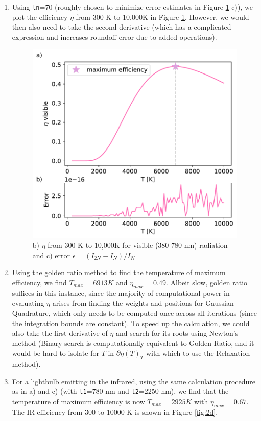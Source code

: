 \documentclass{article}
\newcommand{\code}{\texttt}
\begin{document}
\begin{enumerate}
\begin{enumerate}
  \item Using \code{ln}=70 (roughly chosen to minimize error estimates in Figure \ref{fig:2bc} c)), we plot the efficiency $\eta$ from 300 K to 10,000K in Figure \ref{fig:2bc}. 
  However, we would then also need to take the second derivative (which has a complicated expression and increases roundoff error due to added operations).
  \begin{figure}[H]
    \centering 
    \captionsetup{margin=3.2cm}
    \includegraphics[width=0.5\linewidth]{Q2bc.pdf}
    \caption{\label{fig:2bc} b) $\eta$ from 300 K to 10,000K for visible (380-780 nm) radiation and c) error $\epsilon=(I_{2N} - I_N)/I_N$}
  \end{figure}
  \item Using the golden ratio method to find the temperature of maximum efficiency, we find $T_{max}=6913 K$ and $\eta_{max}=0.49$. Albeit slow, golden ratio suffices in this instance, since the majority of computational power in evaluating $\eta$ arises from finding the weights and positions for Gaussian Quadrature, which only needs to be computed once across all iterations 
  (since the integration bounds are constant). To speed up the calculation, we could also take the first derivative of $\eta$ and search for its roots using Newton's method (Binary search is computationally equivalent to Golden Ratio, and it would be hard to isolate for $T$ in $\partial\eta(T)_T$ with which to use the Relaxation method).
  
  \item For a lightbulb emitting in the infrared, using the same calculation procedure as in a) and c) (with \code{l1}=780 nm and \code{l2}=2250 nm), we find that the temperature of maximum efficiency is now $T_{max}=2925 K$ with $\eta_{max}=0.67$. 
  The IR efficiency from 300 to 10000 K is shown in Figure \ref{fig:2d}.
  

\end{enumerate}
\end{enumerate}
\end{document}
